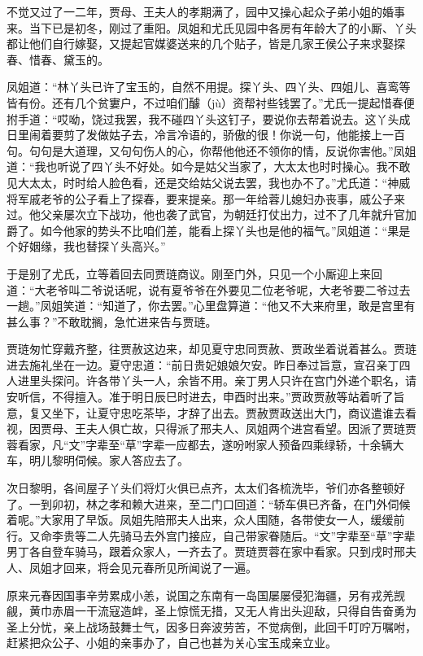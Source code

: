 \documentclass[12pt,oneside]{book}
\begin{document}
不觉又过了一二年，贾母、王夫人的孝期满了，园中又操心起众子弟小姐的婚事来。当下已是初冬，刚过了重阳。凤姐和尤氏见园中各房有年龄大了的小厮、丫头都让他们自行嫁娶，又提起官媒婆送来的几个贴子，皆是几家王侯公子来求娶探春、惜春、黛玉的。

凤姐道：“林丫头已许了宝玉的，自然不用提。探丫头、四丫头、四姐儿、喜鸾等皆有份。还有几个贫寠户，不过咱们醵（jù）资帮衬些钱罢了。”尤氏一提起惜春便拊手道：“哎呦，饶过我罢，我不碰四丫头这钉子，要说你去帮着说去。这丫头成日里闹着要剪了发做姑子去，冷言冷语的，骄傲的很！你说一句，他能接上一百句。句句是大道理，又句句伤人的心，你帮他他还不领你的情，反说你害他。”凤姐道：“我也听说了四丫头不好处。如今是姑父当家了，大太太也时时操心。我不敢见大太太，时时给人脸色看，还是交给姑父说去罢，我也办不了。”尤氏道：“神威将军戚老爷的公子看上了探春，要来提亲。那一年给蓉儿媳妇办丧事，戚公子来过。他父亲屡次立下战功，他也袭了武官，为朝廷打仗出力，过不了几年就升官加爵了。如今他家的势头不比咱们差，能看上探丫头也是他的福气。”凤姐道：“果是个好姻缘，我也替探丫头高兴。”

于是别了尤氏，立等着回去同贾琏商议。刚至门外，只见一个小厮迎上来回道：“大老爷叫二爷说话呢，说有夏爷爷在外要见二位老爷呢，大老爷要二爷过去一趟。”凤姐笑道：“知道了，你去罢。”心里盘算道：“他又不大来府里，敢是宫里有甚么事？”不敢耽搁，急忙进来告与贾琏。

贾琏匆忙穿戴齐整，往贾赦这边来，却见夏守忠同贾赦、贾政坐着说着甚么。贾琏进去施礼坐在一边。夏守忠道：“前日贵妃娘娘欠安。昨日奉过旨意，宣召亲丁四人进里头探问。许各带丫头一人，余皆不用。亲丁男人只许在宫门外递个职名，请安听信，不得擅入。准于明日辰巳时进去，申酉时出来。”贾政贾赦等站着听了旨意，复又坐下，让夏守忠吃茶毕，才辞了出去。贾赦贾政送出大门，商议遣谁去看视，因贾母、王夫人俱亡故，只得派了邢夫人、凤姐两个进宫看望。因派了贾琏贾蓉看家，凡“文”字辈至“草”字辈一应都去，遂吩咐家人预备四乘绿轿，十余辆大车，明儿黎明伺候。家人答应去了。

次日黎明，各间屋子丫头们将灯火俱已点齐，太太们各梳洗毕，爷们亦各整顿好了。一到卯初，林之孝和赖大进来，至二门口回道：“轿车俱已齐备，在门外伺候着呢。”大家用了早饭。凤姐先陪邢夫人出来，众人围随，各带使女一人，缓缓前行。又命李贵等二人先骑马去外宫门接应，自己带家眷随后。“文”字辈至“草”字辈男丁各自登车骑马，跟着众家人，一齐去了。贾琏贾蓉在家中看家。只到戌时邢夫人、凤姐才回来，将会见元春所见所闻说了一遍。

原来元春因国事辛劳累成小恙，说国之东南有一岛国屡屡侵犯海疆，另有戎羌觊觎，黄巾赤眉一干流寇造衅，圣上惊慌无措，又无人肯出头迎敌，只得自告奋勇为圣上分忧，亲上战场鼓舞士气，因多日奔波劳苦，不觉病倒，此回千叮咛万嘱咐，赶紧把众公子、小姐的亲事办了，自己也甚为关心宝玉成亲立业。
\end{document}
